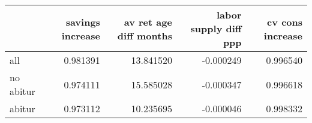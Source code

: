 \begin{tabular}{lrrrr}
\toprule
 & savings increase & av ret age diff months & labor supply diff ppp & cv cons increase \\
\midrule
all & 0.981391 & 13.841520 & -0.000249 & 0.996540 \\
no abitur & 0.974111 & 15.585028 & -0.000347 & 0.996618 \\
abitur & 0.973112 & 10.235695 & -0.000046 & 0.998332 \\
\bottomrule
\end{tabular}
